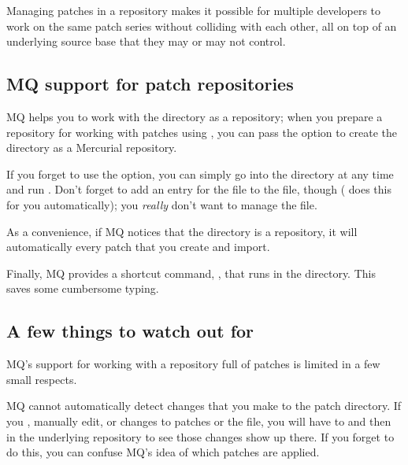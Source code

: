 Managing patches in a repository makes it possible for multiple
developers to work on the same patch series without colliding with
each other, all on top of an underlying source base that they may or
may not control.

\subsection{MQ support for patch repositories}

MQ helps you to work with the  directory as a
repository; when you prepare a repository for working with patches
using , you can pass the  option to
create the  directory as a Mercurial repository.

\begin{note}
  If you forget to use the  option, you can simply go
  into the  directory at any time and run
  .  Don't forget to add an entry for the
   file to the  file, though
  ( does this for you
  automatically); you \emph{really} don't want to manage the
   file.
\end{note}

As a convenience, if MQ notices that the 
directory is a repository, it will automatically  every
patch that you create and import.

Finally, MQ provides a shortcut command, , that runs
 in the  directory.  This saves
some cumbersome typing.

\subsection{A few things to watch out for}

MQ's support for working with a repository full of patches is limited
in a few small respects.

MQ cannot automatically detect changes that you make to the patch
directory.  If you , manually edit, or 
changes to patches or the  file, you will have to
 and then
 in the underlying repository to
see those changes show up there.  If you forget to do this, you can
confuse MQ's idea of which patches are applied.

